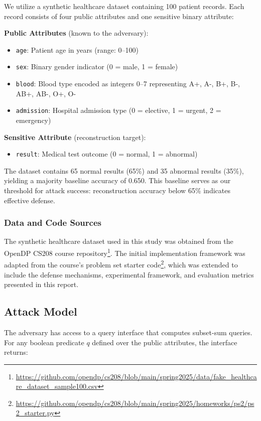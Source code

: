 \documentclass[11pt,letterpaper]{article}
\begin{document}
We utilize a synthetic healthcare dataset containing 100 patient records. Each record consists of four public attributes and one sensitive binary attribute:

\textbf{Public Attributes} (known to the adversary):
\begin{itemize}[leftmargin=*]
    \item \texttt{age}: Patient age in years (range: 0--100)
    \item \texttt{sex}: Binary gender indicator (0 = male, 1 = female)
    \item \texttt{blood}: Blood type encoded as integers 0--7 representing A+, A-, B+, B-, AB+, AB-, O+, O-
    \item \texttt{admission}: Hospital admission type (0 = elective, 1 = urgent, 2 = emergency)
\end{itemize}

\textbf{Sensitive Attribute} (reconstruction target):
\begin{itemize}[leftmargin=*]
    \item \texttt{result}: Medical test outcome (0 = normal, 1 = abnormal)
\end{itemize}

The dataset contains 65 normal results (65\%) and 35 abnormal results (35\%), yielding a majority baseline accuracy of 0.650. This baseline serves as our threshold for attack success: reconstruction accuracy below 65\% indicates effective defense.

\subsubsection{Data and Code Sources}

The synthetic healthcare dataset used in this study was obtained from the OpenDP CS208 course repository\footnote{\url{https://github.com/opendp/cs208/blob/main/spring2025/data/fake_healthcare_dataset_sample100.csv}}. The initial implementation framework was adapted from the course's problem set starter code\footnote{\url{https://github.com/opendp/cs208/blob/main/spring2025/homeworks/ps2/ps2_starter.py}}, which was extended to include the defense mechanisms, experimental framework, and evaluation metrics presented in this report.


\subsection{Attack Model}

The adversary has access to a query interface that computes subset-sum queries. For any boolean predicate $q$ defined over the public attributes, the interface returns:
\end{document}
